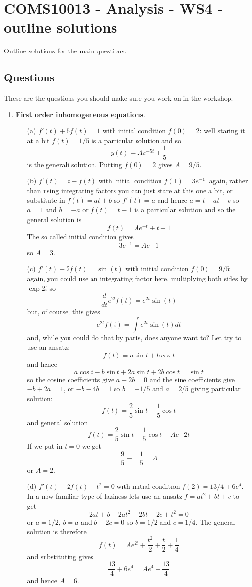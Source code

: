 \documentclass[11pt,a4paper]{scrartcl}
\begin{document}
\section*{COMS10013 - Analysis - WS4 - outline solutions}

Outline solutions for the main questions.

\subsection*{Questions}

These are the questions you should make sure you work on in the workshop.

\begin{enumerate}

\item \textbf{First order inhomogeneous equations}.
	\begin{itemize}
	\item[(a)] $f'(t) + 5f(t) = 1$ with initial condition $f(0) = 2$: well staring it at a bit $f(t)=1/5$ is a particular solution and so
          $$y(t)=Ae^{-5t}+\frac{1}{5}$$
          is the generali solution. Putting $f(0)=2$ gives $A=9/5$.
	\item[(b)] $f'(t) = t - f(t)$ with initial condition $f(1) = 3e^{-1}$: again, rather than using integrating factors you can just stare at this one a bit, or substitute in $f(t)=at+b$ so $f'(t)=a$ and hence $a=t-at-b$ so $a=1$ and $b=-a$ or $f(t)=t-1$ is a particular solution and so the general solution is
          $$f(t)=Ae^{-t}+t-1$$
          The so called initial condition gives
          $$3e^{-1}=Ae{-1}$$
          so $A=3$.
	\item[(c)] $f'(t) +2f(t) = \sin(t)$ with initial condition $f(0) = 9/5$: again, you could use an integrating factor here, multiplying both sides by $\exp{2t}$ so
          $$
          \frac{d}{dt}e^{2t}f(t)=e^{2t}\sin{(t)}$$
          but, of course, this gives
          $$e^{2t}f(t)=\int e^{2t}\sin{(t)} dt$$
          and, while you could do that by parts, does anyone want to? Let try to use an ansatz:
          $$f(t)=a\sin{t}+b\cos{t}$$
          and hence
          $$a\cos{t}-b\sin{t}+2a\sin{t}+2b\cos{t}=\sin{t}$$
          so the cosine coefficients give $a+2b=0$ and the sine coefficients give $-b+2a=1$, or $-b-4b=1$ so $b=-1/5$ and $a=2/5$ giving particular solution:
          $$f(t)=\frac{2}{5}\sin{t}-\frac{1}{5}\cos{t}$$
          and general solution
          $$f(t)=\frac{2}{5}\sin{t}-\frac{1}{5}\cos{t}+Ae{-2t}$$
          If we put in $t=0$ we get
          $$\frac{9}{5}=-\frac{1}{5}+A$$
          or $A=2$.          
	\item[(d)] $f'(t) - 2f(t) + t^2 = 0$ with initial condition $f(2) = 13/4 + 6e^4$. In a now familiar type of laziness lets use an ansatz $f=at^2+bt+c$ to get
          $$2at+b-2at^2-2bt-2c+t^2=0$$
          or $a=1/2$, $b=a$ and $b-2c=0$ so $b=1/2$ and $c=1/4$. The general solution is therefore
          $$f(t)=Ae^{2t}+\frac{t^2}{2}+\frac{t}{2}+\frac{1}{4}$$
          and substituting gives
          $$\frac{13}{4}+6e^4=Ae^4+\frac{13}{4}$$
          and hence $A=6$.
	\end{itemize}



\end{enumerate}
\end{document}
